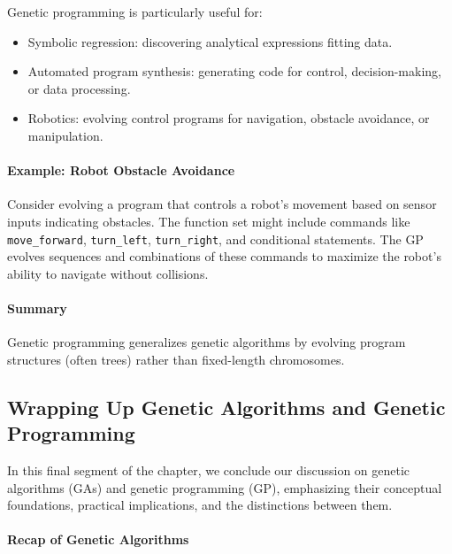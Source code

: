 Genetic programming is particularly useful for:

\begin{itemize}
    \item Symbolic regression: discovering analytical expressions fitting data.
    \item Automated program synthesis: generating code for control, decision-making, or data processing.
    \item Robotics: evolving control programs for navigation, obstacle avoidance, or manipulation.
\end{itemize}

\paragraph{Example: Robot Obstacle Avoidance}

Consider evolving a program that controls a robot's movement based on sensor inputs indicating obstacles. The function set might include commands like \texttt{move\_forward}, \texttt{turn\_left}, \texttt{turn\_right}, and conditional statements. The GP evolves sequences and combinations of these commands to maximize the robot's ability to navigate without collisions.

\paragraph{Summary}

Genetic programming generalizes genetic algorithms by evolving program structures (often trees) rather than fixed-length chromosomes.

\subsection{Wrapping Up Genetic Algorithms and Genetic Programming}
\label{sec:evo_wrapping_up_genetic_algorithms_and_genetic_programming}

In this final segment of the chapter, we conclude our discussion on genetic algorithms (GAs) and genetic programming (GP), emphasizing their conceptual foundations, practical implications, and the distinctions between them.

\paragraph{Recap of Genetic Algorithms}

